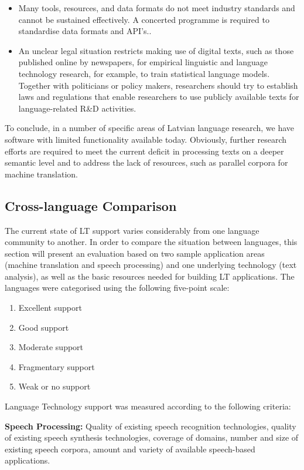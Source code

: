 \begin{multicols}{2}
\begin{itemize}
    \item Many tools, resources, and data formats do not meet industry standards and cannot be sustained effectively.
A concerted programme is required to standardise data formats and API's..

    \item An unclear legal situation restricts making use of digital texts, such as those published online by newspapers, for empirical linguistic and language technology research, for example, to train statistical language models.
 Together with politicians or policy makers, researchers should try to establish laws and regulations that enable researchers to use publicly available texts for language-related R\&D activities.

    \end{itemize}

To conclude, in a number of specific areas of Latvian language research, we have software with limited functionality available today.
Obviously, further research efforts are required to meet the current deficit in processing texts on a deeper semantic level and to address the lack of resources, such as parallel corpora for machine translation. 

\subsection{Cross-language Comparison}

The current state of LT support varies considerably from one language community to another.
In order to compare the situation between languages, this section will present an evaluation based on two sample application areas (machine translation and speech processing) and one underlying technology (text analysis), as well as the basic resources needed for building LT applications.
The languages were categorised using the following five-point scale:

\begin{enumerate}
\item Excellent support
\item Good support
\item Moderate support
\item Fragmentary support
\item Weak or no support
\end{enumerate}

Language Technology support was measured according to the following criteria:

\textbf{Speech Processing:} Quality of existing speech recognition technologies, quality of existing speech synthesis technologies, coverage of domains, number and size of existing speech corpora, amount and variety of available speech-based applications.


\end{multicols}
